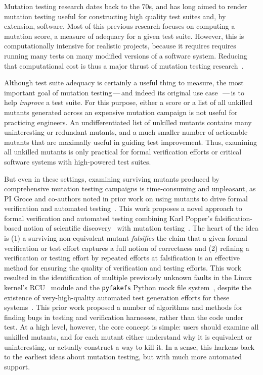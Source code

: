 Mutation testing research dates back to the 70s, and has long aimed to render
mutation testing useful for constructing high quality
test suites and, by extension, software. 
Most of this previous 
research focuses on computing a mutation score, a measure of adequacy for a
given test suite.  However, this is computationally intensive for realistic
projects, because it requires requires running many tests on many modified
versions of a software system.  Reducing that computational cost is thus a major
thrust of mutation testing research~\cite{jia2011analysis}.   

Although test suite adequacy is certainly a useful thing to measure, the most
important goal of mutation testing\,---\,and indeed its original use
case~\cite{budd1980theoretical}\,---\,is to help \emph{improve} a test suite.  For this
purpose, either a score or a list of all unkilled mutants generated across an
expensive mutation campaign is not useful for practicing engineers.  An
undifferentiated list of unkilled mutants contains many uninteresting or
redundant mutants, and a much smaller number of actionable mutants that are
maximally useful in guiding test improvement.  Thus, examining all unkilled
mutants is only practical for formal verification efforts or critical software
systems with high-powered test suites. 

But even in these settings, examining
surviving mutants produced by comprehensive mutation testing campaigns is
time-consuming and unpleasant, as PI Groce and co-authors noted in prior work on
using mutants to drive formal verification and automated
testing~\cite{groce2015verified,groce2018verified,mutKernel}.
%
This work proposes a novel approach to
formal verification and automated testing 
combining Karl Popper's falsification-based notion of
scientific discovery~\cite{Popper,popperconjectures} with mutation
testing~\cite{groce2015verified,groce2018verified,mutKernel}.
The heart of the idea is (1) a surviving non-equivalent mutant 
\emph{falsifies} the claim that a given
formal verification or test effort captures a full notion of
correctness and (2) refining a
verification or testing effort by repeated efforts at falsification is an
effective method for ensuring the quality of verification and testing
efforts.  This
work resulted in the identification of multiple previously unknown faults in
the Linux kernel's
RCU~\cite{MathieuDesnoyers2012URCU,DinakarGuniguntala2008IBMSysJ,McKenney:2013:SDS:2483852.2483867}
module and the {\tt pyfakefs} Python mock file
system~\cite{pyfakefs}, despite the existence of very-high-quality
automated test generation efforts for these
systems~\cite{rcutorture,TSTL}.  This prior work 
proposed a number of algorithms and
methods for finding bugs in testing and verification
harnesses, rather than the code under test.  At a high level, however,
the core concept is simple:  users should examine all unkilled
mutants, and for each mutant either understand why it is
equivalent or uninteresting, or actually construct a way to kill it.  In a sense, this harkens back to the
earliest ideas about mutation testing, but with 
much more automated support. 

